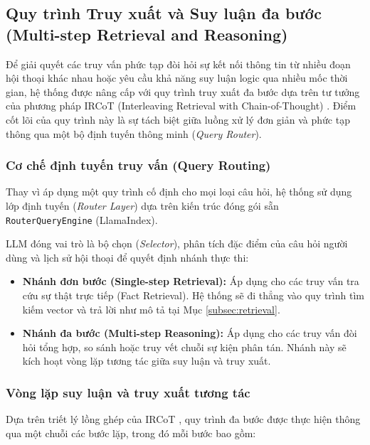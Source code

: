 \subsection{Quy trình Truy xuất và Suy luận đa bước (Multi-step Retrieval and Reasoning)}
\label{subsec:multistep}

Để giải quyết các truy vấn phức tạp đòi hỏi sự kết nối thông tin từ nhiều đoạn hội thoại khác nhau hoặc yêu cầu khả năng suy luận logic qua nhiều mốc thời gian, hệ thống được nâng cấp với quy trình truy xuất đa bước dựa trên tư tưởng của phương pháp IRCoT (Interleaving Retrieval with Chain-of-Thought) \cite{trivedi2023interleaving}. Điểm cốt lõi của quy trình này là sự tách biệt giữa luồng xử lý đơn giản và phức tạp thông qua một bộ định tuyến thông minh (\textit{Query Router}).

\subsubsection{Cơ chế định tuyến truy vấn (Query Routing)}
Thay vì áp dụng một quy trình cố định cho mọi loại câu hỏi, hệ thống sử dụng lớp định tuyến (\textit{Router Layer}) dựa trên kiến trúc đóng gói sẵn \texttt{RouterQueryEngine} (LlamaIndex). 

LLM đóng vai trò là bộ chọn (\textit{Selector}), phân tích đặc điểm của câu hỏi người dùng và lịch sử hội thoại để quyết định nhánh thực thi:
\begin{itemize}
    \item \textbf{Nhánh đơn bước (Single-step Retrieval):} Áp dụng cho các truy vấn tra cứu sự thật trực tiếp (Fact Retrieval). Hệ thống sẽ đi thẳng vào quy trình tìm kiếm vector và trả lời như mô tả tại Mục \ref{subsec:retrieval}.
    \item \textbf{Nhánh đa bước (Multi-step Reasoning):} Áp dụng cho các truy vấn đòi hỏi tổng hợp, so sánh hoặc truy vết chuỗi sự kiện phân tán. Nhánh này sẽ kích hoạt vòng lặp tương tác giữa suy luận và truy xuất.
\end{itemize}

\subsubsection{Vòng lặp suy luận và truy xuất tương tác}
Dựa trên triết lý lồng ghép của IRCoT \cite{trivedi2023interleaving}, quy trình đa bước được thực hiện thông qua một chuỗi các bước lặp, trong đó mỗi bước bao gồm:

